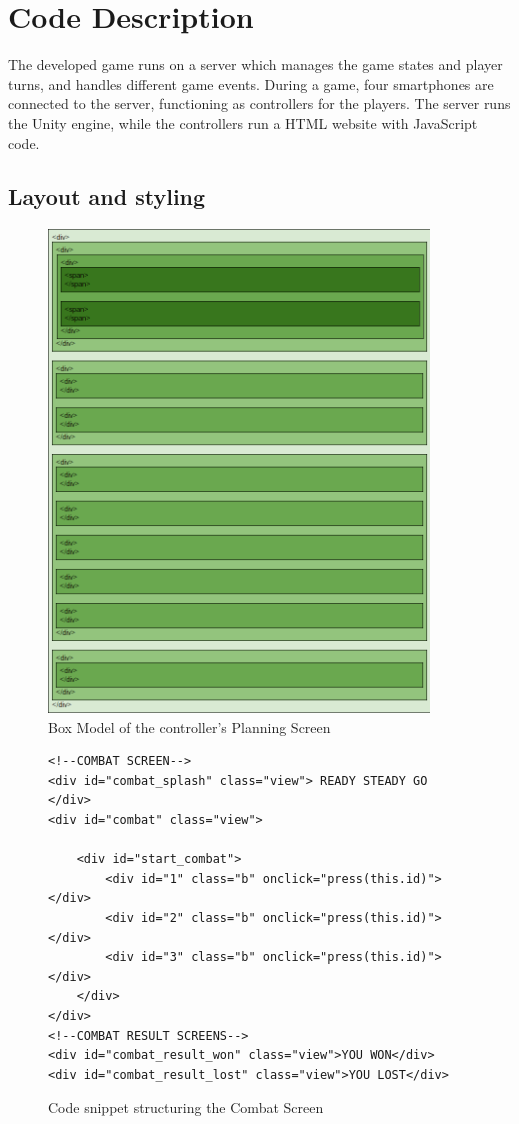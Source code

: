 \chapter{Code Description}\label{ch:codeDescription}
The developed game runs on a server which manages the game states and player turns, and handles different game events. During a game, four smartphones are connected to the server, functioning as controllers for the players. The server runs the Unity engine, while the controllers run a HTML website with JavaScript code.

\section{Layout and styling}\label{sec:codeLayoutStyling}

\begin{figure}[h!]
	\centering
	\includegraphics[width=0.9\textwidth]{figures/controller_box_model.png}
	\caption{Box Model of the controller's Planning Screen \label{fig:controllerBoxModel}}
\end{figure}

\begin{figure}
\begin{lstlisting}[language=HTML5]
<!--COMBAT SCREEN-->
<div id="combat_splash" class="view"> READY STEADY GO </div>
<div id="combat" class="view">

	<div id="start_combat">
		<div id="1" class="b" onclick="press(this.id)"></div>
		<div id="2" class="b" onclick="press(this.id)"></div>
		<div id="3" class="b" onclick="press(this.id)"></div>
	</div>
</div>
<!--COMBAT RESULT SCREENS-->
<div id="combat_result_won" class="view">YOU WON</div>
<div id="combat_result_lost" class="view">YOU LOST</div>
\end{lstlisting}
\caption{Code snippet structuring the Combat Screen \label{HTMLex}}
\end{figure}


